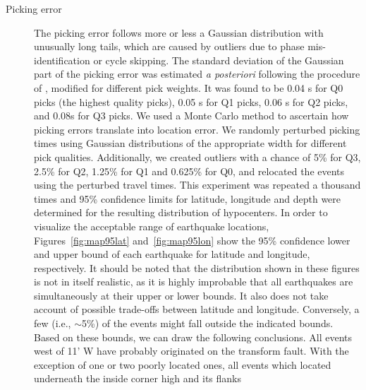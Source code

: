 \documentclass[jgr]{aguplus}
\newlength{\tw}
\begin{document}
\begin{article}
\begin{description}
\item[Picking error]
The picking error follows more or less a Gaussian distribution with
unusually long tails, which are caused by outliers due to phase mis-identification
or cycle skipping.   The standard deviation of the Gaussian
part of the picking
error was estimated {\it a posteriori} following the procedure of \citet{wilcock91},
modified for different pick weights.  It was found to be 0.04 s for
Q0 picks (the highest quality picks), 0.05 s for Q1 picks, 0.06 s for Q2 picks, and 0.08s
for Q3 picks.    We  used a Monte Carlo method to ascertain how picking errors
translate into location error. We randomly perturbed picking times
using Gaussian distributions of the appropriate width for different pick
qualities.  Additionally, we created outliers with
a chance of 5\% for Q3, 2.5\% for Q2, 1.25\% for Q1 and 0.625\% for
Q0, and relocated the events using the perturbed travel times. This
experiment was repeated a thousand times and 95\% confidence limits for
latitude, longitude and depth were determined for the resulting distribution of
hypocenters.
 In order to visualize the acceptable range
of earthquake locations, Figures~\ref{fig:map95lat}
and~\ref{fig:map95lon} show the 95\% confidence lower and upper bound of each
earthquake for latitude and longitude, respectively. It should be
noted that the distribution shown in these figures is not in itself realistic, as it is
highly improbable that all earthquakes are simultaneously at their
upper or lower bounds. It also does not take account of possible
trade-offs between latitude and longitude.  Conversely, a few
(i.e., $\sim$5\%) of the events might fall outside the indicated
bounds.  Based on these bounds, we can draw the following conclusions.
All events west of 11' W  have probably originated on the transform
fault.  With the exception of one or two poorly located ones, all
events which located underneath the inside corner high and its flanks

\end{description}
\end{article}
\end{document}
